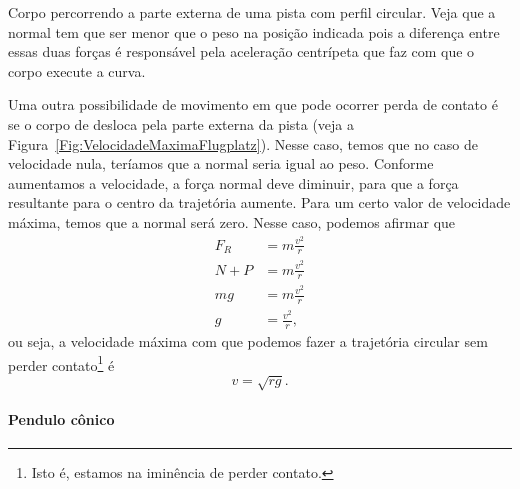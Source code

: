 \begin{marginfigure}
\centering
{}
\caption{Corpo percorrendo a parte externa de uma pista com perfil circular. Veja que a normal tem que ser menor que o peso na posição indicada pois a diferença entre essas duas forças é responsável pela aceleração centrípeta que faz com que o corpo execute a curva.\label{Fig:VelocidadeMaximaFlugplatz}}
\end{marginfigure}

Uma outra possibilidade de movimento em que pode ocorrer perda de contato é se o corpo de desloca pela parte externa da pista (veja a Figura~\ref{Fig:VelocidadeMaximaFlugplatz}). Nesse caso, temos que no caso de velocidade nula, teríamos que a normal seria igual ao peso. Conforme aumentamos a velocidade, a força normal deve diminuir, para que a força resultante para o centro da trajetória aumente. Para um certo valor de velocidade máxima, temos que a normal será zero. Nesse caso, podemos afirmar que
\begin{align}
    F_R &= m \frac{v^2}{r} \\
    N + P &= m \frac{v^2}{r} \\
    mg &= m \frac{v^2}{r} \\
    g &= \frac{v^2}{r},
\end{align}
%
ou seja, a velocidade máxima com que podemos fazer a trajetória circular sem perder contato\footnote[][-2cm]{Isto é, estamos na iminência de perder contato.} é
\begin{equation}
    v = \sqrt{rg}.
\end{equation}

\paragraph{Pendulo cônico}

